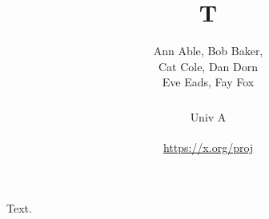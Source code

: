 \documentclass{article}
\title{T}
\author{Ann Able, Bob Baker, \\ Cat Cole, Dan Dorn \\ Eve Eads, Fay Fox \\ ~~~~\\ \textsuperscript{}Univ A \\ ~~~~\\ \url{https://x.org/proj}}
\begin{document}
\maketitle
Text.
\end{document}
